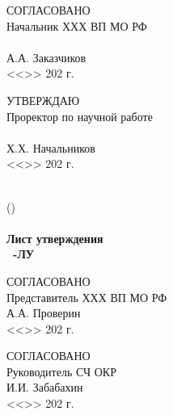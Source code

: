 
\ifDSTUHaveESKDFrame
\makeatletter
\def\@oddhead{\titleFrame}
\def\@oddfoot{}
\makeatother
\fi

\addtocounter{page}{-1}

\parbox[t]{.45\linewidth}{
	СОГЛАСОВАНО\\
	Начальник ХХХ ВП МО РФ \\
	\\
	\underline{\hspace{20mm}} А.А. Заказчиков \\
	<<\underline{\hspace{10mm}}>>  \underline{\hspace{30mm}} 202\underline{\hspace{5mm}} г.
}
\hspace{10mm}
\parbox[t]{.45\linewidth}{
	УТВЕРЖДАЮ\\
	Проректор по научной работе \\
	\orgName 	\\ 	
	\underline{\hspace{20mm}} Х.Х. Начальников \\
	<<\underline{\hspace{10mm}}>>  \underline{\hspace{30mm}} 202\underline{\hspace{5mm}} г.
}



\hfill 
\vspace{35mm}

\begin{centering}
\MakeUppercase{\devNameFull} \\
(\devName) \\
{\bfseries {\docTypeFull} \\
{Лист утверждения} \\
\decim\ \docType-ЛУ} \\
\end{centering}


\hfill 
\vspace{35mm}

\parbox[t]{.45\linewidth}{
	СОГЛАСОВАНО\\
	Представитель ХХХ ВП МО РФ \\
	\underline{\hspace{20mm}} А.А. Проверин \\
	<<\underline{\hspace{10mm}}>>  \underline{\hspace{30mm}} 202\underline{\hspace{5mm}} г.
}
\hspace{10mm}
\parbox[t]{.45\linewidth}{
	СОГЛАСОВАНО \\
	Руководитель СЧ ОКР \\
	\underline{\hspace{20mm}} И.И. Забабахин  \\
	<<\underline{\hspace{10mm}}>>  \underline{\hspace{30mm}} 202\underline{\hspace{5mm}} г.
}



